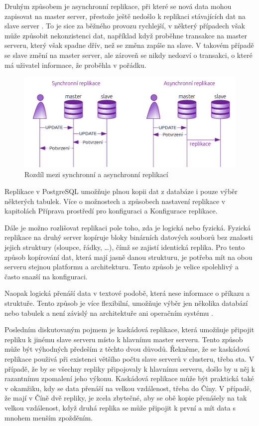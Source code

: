 Druhým způsobem je asynchronní replikace, při které se nová data mohou zapisovat na master server, přestože ještě nedošlo k replikaci stávajících dat na slave server \citep{ObeHsu2012}. To je sice za běžného provozu rychlejší, v některý případech však může způsobit nekonzistenci dat, například když proběhne transakce na master serveru, který však spadne dřív, než se změna zapíše na slave. V takovém případě se slave změní na master server, ale zároveň se nikdy nedozví o transakci, o které má uživatel informace, že proběhla v pořádku. 

        \begin{figure}[H]
          \centering
          \includegraphics[scale=1]{../../../grafy/obr/schema_asyncSync_maxiTence.png}
          \caption {Rozdíl mezi synchronní a asynchronní replikací}
        \end{figure}
Replikace v PostgreSQL umožňuje plnou kopii dat z databáze i pouze výběr některých tabulek. Více o možnostech a způsobech nastavení replikace v kapitolách  Příprava prostředí pro konfiguraci a  Konfigurace replikace.

Dále je možno rozlišovat replikaci pole toho, zda je logická nebo fyzická. Fyzická replikace na druhý server kopíruje bloky binárních datových souborů bez znalosti jejich struktury (sloupce, řádky, …), čímž se zajistí identická replika. Pro tento způsob kopírování dat, která mají jasně danou strukturu, je potřeba mít na obou serveru stejnou platformu a architekturu. Tento způsob je velice spolehlivý a často snazší na konfiguraci. 

Naopak logická přenáší data v textové podobě, která nese informace o příkazu a struktuře. Tento způsob je více flexibilní, umožňuje výběr jen několika databází nebo tabulek a není závislý na architektuře ani operačním systému \citep{Boszormenyi2013}. 

Posledním diskutovaným pojmem je kaskádová replikace, která umožňuje připojit repliku k jinému slave serveru místo k hlavnímu master serveru. Tento způsob může být výhodných předeším z těchto dvou důvodů. Řekněme, že se kaskádová replikace použivá při existenci většího počtu slave serverů v clusteru, třeba sta. V případě, že by se všechny repliky připojovaly k hlavnímu serveru, došlo by u něj k razantnímu zpomalení jeho výkonu. Kaskádová replikace může být praktická také v okamžiku, kdy se data přenáší na velkou vzdálenost, třeba do Číny. V případě, že mají v Číně dvě repliky, je zcela zbytečné, aby se obě kopie přenášely na tak velkou vzdálenost, když druhá replika se může připojit k první a mít data s mnohem menším zpožděním.

